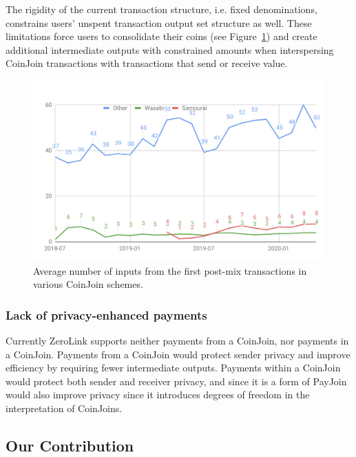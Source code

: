 \documentclass{article}
\begin{document}
The rigidity of the current transaction structure, i.e. fixed denominations, constrains users' unspent transaction output set structure as well. These limitations force users to consolidate their coins (see Figure~\ref{fig:postmixmerging}) and create additional intermediate outputs with constrained amounts when interspersing CoinJoin transactions with transactions that send or receive value.

\begin{figure}[h!]
    \centering
    \includegraphics[scale=0.4]{Figures/postMixInputMerging.pdf}
    \caption[]{Average number of inputs from the first post-mix transactions in various CoinJoin schemes.\footnotemark}
    \label{fig:postmixmerging}
\end{figure}


\subsubsection{Lack of privacy-enhanced payments} Currently ZeroLink supports neither payments from a CoinJoin, nor payments in a CoinJoin. Payments from a CoinJoin would protect sender privacy and improve efficiency by requiring fewer intermediate outputs. Payments within a CoinJoin would protect both sender and receiver privacy, and since it is a form of PayJoin~\cite{payjoin} would also improve privacy since it introduces degrees of freedom in the interpretation of CoinJoins.

\subsection{Our Contribution}
\end{document}

